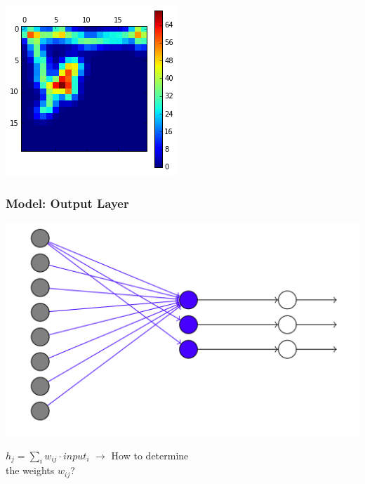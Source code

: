 \begin{frame}
\begin{multicols}{2}
\begin{center}
\vskip 4mm
\includegraphics[scale=.4]{pics/activity_demo}
\end{center}
\end{multicols}
\end{frame}

\begin{frame}
\frametitle{Model: Output Layer}
\begin{multicols}{2}
\begin{center}
\includegraphics[scale=.1]{pics/model_output}
\end{center}
\columnbreak
\begin{center}
$h_j = \sum_i w_{ij} \cdot input_i$
\vskip 5mm
$\rightarrow$ How to determine\\ \hskip 4mm the weights $w_{ij}$?
\end{center}
\end{multicols}
\end{frame}

